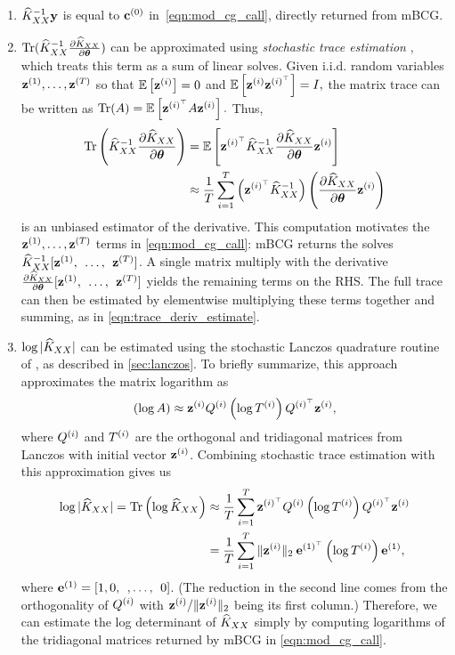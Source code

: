 \begin{enumerate}
  \item $\widehat{K}_{XX}^{-1}\mathbf{y}$ is equal to $\mathbf{c}^{(0)}$ in~\cref{eqn:mod_cg_call}, directly returned from mBCG.

  \item $\tr{ \trainK^{-1} \frac{\partial \trainK}{\partial \btheta} }$ can be approximated using \emph{stochastic trace estimation} \cite{hutchinson1990stochastic,fitzsimons2016improved}, which treats this term as a sum of linear solves.
    Given i.i.d. random variables $\mathbf{z}^{(1)}, \ldots, \mathbf{z}^{(T)}$ so that $\operatorname*{\mathbb{E}} \left[ \mathbf{z}^{(i)} \right]=0$ and $\operatorname*{\mathbb{E}} \left[ \mathbf{z}^{(i)} \mathbf{z}^{(i)^\top} \right]=I,
    $
    the matrix trace can be written as
    $
      \tr{\bA} = \Ev{\bz^{(i)^\top} \bA\bz^{(i)}}.
    $
    Thus,
    \begin{align}
      \tr{\trainK^{-1}\frac{\partial \trainK}{\partial \btheta}} &= \Ev{\bz^{(i)^\top} \trainK^{-1} \frac{\partial \trainK}{\partial \btheta} \bz^{(i)}}
      \nonumber \\
      &\approx \frac{1}{T}\sum_{i=1}^{T}\left(\bz^{(i)^\top} \trainK^{-1}\right)\left(\frac{\partial \trainK}{\partial \btheta}\bz^{(i)} \right)
      \label{eqn:trace_deriv_estimate}
    \end{align}
    is an unbiased estimator of the derivative. This computation motivates the $\mathbf{z}^{(1)}, \ldots, \mathbf{z}^{(T)}$ terms in \cref{eqn:mod_cg_call}:
    mBCG returns the solves $\widehat{K}_{XX}^{-1}[\mathbf{z}^{(1)}, \:\: \ldots, \:\: \mathbf{z}^{(T)}]$.
    A single matrix multiply with the derivative $\frac{\partial \widehat{K}_{XX}}{\partial \boldsymbol{\theta}}[\mathbf{z}^{(1)}, \:\: \ldots, \:\: \mathbf{z}^{(T)}]$ yields the remaining terms on the RHS.
    The full trace can then be estimated by elementwise multiplying these terms together and summing, as in \cref{eqn:trace_deriv_estimate}.

  \item $\log \vert \widehat{K}_{XX} \vert$
    can be estimated using the stochastic Lanczos quadrature routine of \citet{ubaru2017fast}, as described in \cref{sec:lanczos}.
    To briefly summarize, this approach approximates the matrix logarithm as
    \[ \left( \log A \right) \approx \mathbf{z}^{(i)} Q^{(i)} \left( \log T^{(i)} \right) Q^{(i)^\top} \mathbf{z}^{(i)}, \]
    where $Q^{(i)}$ and $T^{(i)}$ are the orthogonal and tridiagonal matrices from Lanczos with initial vector $\mathbf{z}^{(i)}$.
    Combining stochastic trace estimation with this approximation gives us
    \begin{align*}
      \log \vert \trainK \vert = \tr{ \log \trainK }
      &\approx \frac{1}{T} \sum_{i=1}^T \bz^{(i)^\top} \bQ^{(i)} \left( \log \bT^{(i)} \right) \bQ^{(i)^\top} \bz^{(i)}
      \\
      &= \frac{1}{T} \sum_{i=1}^T \Vert \bz^{(i)} \Vert_2 \: \be^{(1)^\top} \left( \log \bT^{(i)} \right) \be^{(1)},
    \end{align*}
    where $\mathbf{e}^{(1)} = [1, 0, \:\:, \ldots, \:\: 0]$.
    (The reduction in the second line comes from the orthogonality of $Q^{(i)}$ with $\mathbf{z}^{(i)} / \Vert \mathbf{z}^{(i)} \Vert_2$ being its first column.)
    Therefore, we can estimate the log determinant of $\widehat{K}_{XX}$ simply by computing logarithms of the tridiagonal matrices returned by mBCG in \cref{eqn:mod_cg_call}.
\end{enumerate}
